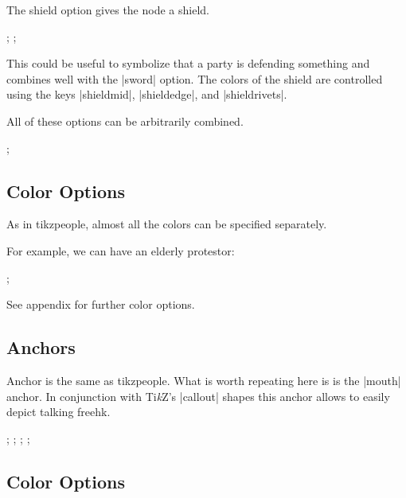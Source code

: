 \documentclass{ltxdoc}
\newcommand{\tikzname}{Ti\emph{k}Z\xspace}
\newcommand{\DescribeOption}[1]{\leavevmode
	\marginpar{\raggedleft\strut\MacroFont\string #1\ }}
\begin{document}
	\DescribeOption{shield} The \textsf{shield} option gives the node a shield.
		\begin{codeexample}{4cm}
\node[protestor,shield,minimum size=1cm,xshift=-1.2cm]{};
\node[hkpolice,shield,minimum size=1cm]{};
		\end{codeexample}
		This could be useful to symbolize that a party is defending something and combines well with the |sword| option.
		The colors of the shield are controlled using the keys |shieldmid|, |shieldedge|, and |shieldrivets|.
	
	

	All of these options can be arbitrarily combined. 
	\begin{codeexample}{4cm}
\node[protestor,evil,female,good,mirrored,
monitor, mask, umbrella,sword,minimum size=1.5cm]{};
	\end{codeexample}


\subsection{Color Options}
	As in \textsf{tikzpeople}, almost all the colors can be specified separately.
	
	For example, we can have an elderly protestor:
	\begin{codeexample}{3cm}
\node[protestor, shirt=black, hair=gray, minimum size=1.5cm]{};
	\end{codeexample}

See appendix for further color options.

\subsection{Anchors}

Anchor is the same as \textsf{tikzpeople}. What is worth repeating here is is the |mouth| anchor. In conjunction with \tikzname's |callout| shapes this anchor allows to easily depict talking \textsf{freehk}.
	\begin{codeexample}{4.6cm}
\node[name=a,shape=protestor,sign,minimum size=1cm,xshift=-1.25cm] {};
\node[name=b,shape=hkpolice,minimum size=1cm,mirrored,xshift=1.25cm] {};
;
;
	\end{codeexample}

\clearpage
\begin{appendices}
\section{Color Options}
\vfill{}
	\end{appendices}
\end{document}
